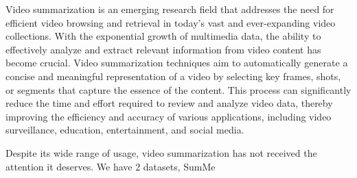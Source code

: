 \begin{EnAbstract}
  Video summarization is an emerging research field that addresses the need for efficient video browsing and retrieval in today's vast and ever-expanding video collections. With the exponential growth of multimedia data, the ability to effectively analyze and extract relevant information from video content has become crucial. Video summarization techniques aim to automatically generate a concise and meaningful representation of a video by selecting key frames, shots, or segments that capture the essence of the content. This process can significantly reduce the time and effort required to review and analyze video data, thereby improving the efficiency and accuracy of various applications, including video surveillance, education, entertainment, and social media.

  Despite its wide range of usage, video summarization has not received the attention it deserves. We have 2 datasets, SumMe \cite{SumMe}
\end{EnAbstract}